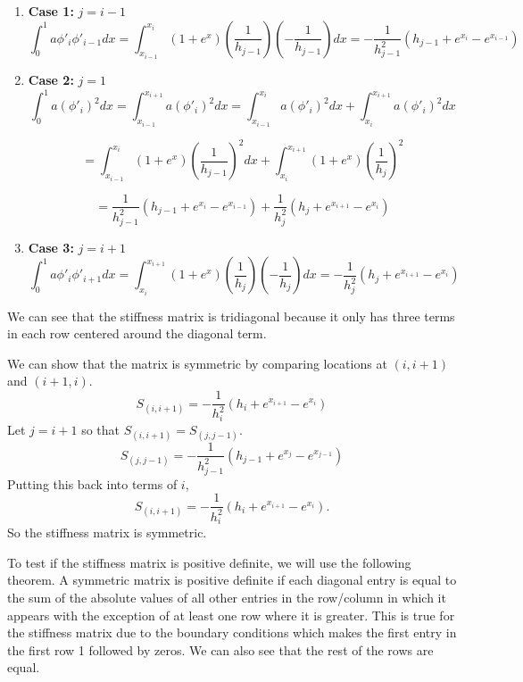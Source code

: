 \documentclass[11pt, oneside]{article}   	%
\begin{document}
\begin{enumerate}
\begin{enumerate}

\item \textbf{Case 1:} $j = i-1$
\[
\int_0^1 a \phi'_i \phi'_{i-1} dx = \int_{x_{i-1}}^{x_i} (1+e^x) \left( \frac{1}{h_{j-1}} \right) \left( -\frac{1}{h_{j-1}} \right)dx = -\frac{1}{h_{j-1}^2}(h_{j-1} + e^{x_i} - e^{x_{i-1}})
\]

\item \textbf{Case 2:} $j =1$
\[
\int_0^1 a (\phi'_i)^2 dx = \int_{x_{i-1}}^{x_{i+1}} a (\phi'_i)^2 dx = \int_{x_{i-1}}^{x_i}a (\phi'_i)^2 dx + \int_{x_{i}}^{x_{i+1}} a (\phi'_i)^2 dx
\]

\[
= \int_{x_{i-1}}^{x_i} (1 + e^x) \left( \frac{1}{h_{j-1}} \right)^2 dx + \int_{x_{i}}^{x_{i+1}} (1 + e^x) \left( \frac{1}{h_{j}}\right)^2 
\]

\[
= \frac{1}{h_{j-1}^2}(h_{j-1} + e^{x_i} - e^{x_{i-1}}) + \frac{1}{h_{j}^2}(h_{j} + e^{x_{i+1}} - e^{x_{i}})
\]

\item \textbf{Case 3:} $j = i+1$
\[
\int_0^1 a \phi'_i \phi'_{i+1} dx = \int_{x_{i}}^{x_{i+1}} (1+e^x) \left( \frac{1}{h_{j}} \right) \left( -\frac{1}{h_{j}} \right)dx = -\frac{1}{h_{j}^2}(h_{j} + e^{x_{i+1}} - e^{x_{i}})
\]

\end{enumerate}

\vspace{2mm}

We can see that the stiffness matrix is tridiagonal because it only has three terms in each row centered around the diagonal term. 

We can show that the matrix is symmetric by comparing locations at $(i,i+1)$ and $(i+1,i)$.
\[
S_{(i,i+1)} = -\frac{1}{h_i^2} (h_i + e^{x_{i+1}} - e^{x_i})
\]
Let $j = i+1$ so that $S_{(i,i+1)} = S_{(j,j-1)}$.
\[
S_{(j,j-1)} = -\frac{1}{h_{j-1}^2}(h_{j-1} + e^{x_j} - e^{x_{j-1}})
\]
Putting this back into terms of $i$,
\[
S_{(i,i+1)} = -\frac{1}{h_i^2} (h_i + e^{x_{i+1}} - e^{x_i}).
\]
So the stiffness matrix is symmetric.

To test if the stiffness matrix is positive definite, we will use the following theorem. A symmetric matrix is positive definite if each diagonal entry is equal to the sum of the absolute values of all other entries in the row/column in which it appears with the exception of at least one row where it is greater. This is true for the stiffness matrix due to the boundary conditions which makes the first entry in the first row 1 followed by zeros. We can also see that the rest of the rows are equal.


\end{enumerate}
\end{document}
